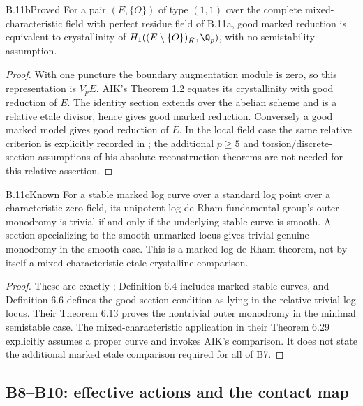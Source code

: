 \begin{claim}{B.11b}{Proved}
For a pair $(E,\{O\})$ of type $(1,1)$ over the complete mixed-characteristic
field with perfect residue field of B.11a, good marked reduction is
equivalent to crystallinity of
$H_1((E\setminus\{O\})_{\bar K},\Q_p)$, with no semistability assumption.
\end{claim}
\begin{proof}
With one puncture the boundary augmentation module is zero, so this
representation is $V_pE$. AIK's Theorem 1.2 equates its crystallinity with
good reduction of $E$. The identity section extends over the abelian scheme
and is a relative etale divisor, hence gives good marked reduction.
Conversely a good marked model gives good reduction of $E$. In the local
field case the same relative criterion is explicitly recorded in
\citet[Theorem 3.1 and Introduction]{BC_Porowski}; the additional $p\ge5$
and torsion/discrete-section assumptions of his absolute reconstruction
theorems are not needed for this relative assertion.
\end{proof}

\begin{claim}{B.11c}{Known}
For a stable marked log curve over a standard log point over a
characteristic-zero field, its unipotent log de Rham fundamental group's
outer monodromy is trivial if and only if the underlying stable curve is
smooth. A section specializing to the smooth unmarked locus gives trivial
genuine monodromy in the smooth case. This is a marked log de Rham theorem,
not by itself a mixed-characteristic etale crystalline comparison.
\end{claim}
\begin{proof}
These are exactly \citet[Theorem 6.5 and Proposition 6.8]{BC_CDPS};
Definition 6.4 includes marked stable curves, and Definition 6.6 defines
the good-section condition as lying in the relative trivial-log locus.
Their Theorem 6.13 proves the nontrivial outer monodromy in the minimal
semistable case. The mixed-characteristic application in their Theorem 6.29
explicitly assumes a proper curve and invokes AIK's comparison. It does
not state the additional marked etale comparison required for all of B7.
\end{proof}





\subsection{B8--B10: effective actions and the contact map}


